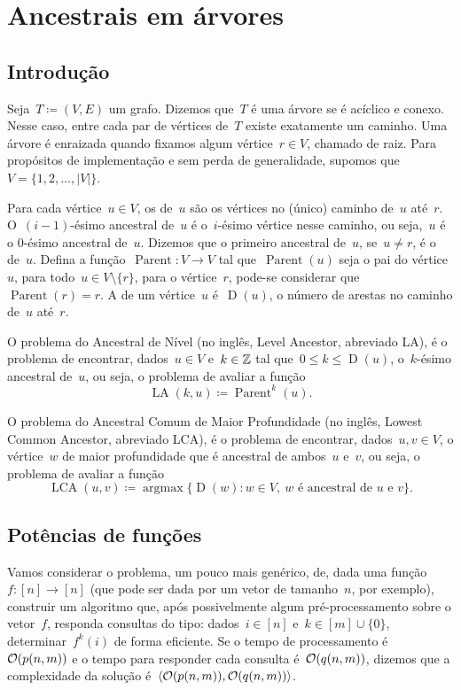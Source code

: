 \documentclass[main.tex]{subfiles}
\providecommand{\Par}{\operatorname{Parent}}
\newcommand{\LA}{\operatorname{LA}}
\newcommand{\Dep}{\operatorname{D}}
\newcommand{\LCA}{\operatorname{LCA}}
\newcommand{\argmax}{\operatorname{argmax}}
\begin{document}
\chapter{Ancestrais em árvores} \label{cap:ancestrais}

\section{Introdução}

Seja~$T \coloneqq (V, E)$ um grafo. Dizemos que~$T$ é uma árvore se é acíclico e conexo. Nesse caso, entre cada par de vértices de~$T$ existe exatamente um caminho. Uma árvore é enraizada quando fixamos algum vértice~${r \in V}$, chamado de raiz. Para propósitos de implementação e sem perda de generalidade, supomos que~$V = \{1, 2, \ldots, |V|\}$.


Para cada vértice~${u \in V}$, os  de~$u$ são os vértices no (único) caminho de~$u$ até~$r$. O~$(i-1)$-ésimo ancestral de~$u$ é o~$i$-ésimo vértice nesse caminho, ou seja,~$u$ é o $0$-ésimo ancestral de~$u$. Dizemos que o primeiro ancestral de~$u$, se~$u \neq r$, é o  de~$u$. Defina a função~${\Par: V \rightarrow V}$ tal que~$\Par(u)$ seja o pai do vértice~$u$, para todo~$u \in V \setminus \{r\}$, para o vértice~$r$, pode-se considerar que~$\Par(r) = r$. A  de um vértice~$u$ é~$\Dep(u)$, o número de arestas no caminho de~$u$ até~$r$.

O problema do Ancestral de Nível (no inglês, Level Ancestor, abreviado LA), é o problema de encontrar, dados~$u \in V$ e~$k \in \mathbb{Z}$ tal que~$0 \leq k \leq \Dep(u)$, o~$k$-ésimo ancestral de~$u$, ou seja, o problema de avaliar a função
$$\LA(k, u) \coloneqq \Par^k(u). $$

O problema do Ancestral Comum de Maior Profundidade (no inglês, Lowest Common Ancestor, abreviado LCA), é o problema de encontrar, dados~$u, v \in V$, o vértice~$w$ de maior profundidade que é ancestral de ambos~$u$ e~$v$, ou seja, o problema de avaliar a função
$$\LCA(u, v) \coloneqq \argmax\{\Dep(w) : w \in V,\ w \text{ é ancestral de $u$ e $v$}\}. $$

\section{Potências de funções} \label{sec:potfunc}

Vamos considerar o problema, um pouco mais genérico, de, dada uma função~$f : [n] \rightarrow [n]$ (que pode ser dada por um vetor de tamanho~$n$, por exemplo), construir um algoritmo que, após possivelmente algum pré-processamento sobre o vetor~$f$, responda consultas do tipo: dados~$i \in [n]$ e~$k \in [m] \cup \{0\}$, determinar~$f^k(i)$ de forma eficiente. Se o tempo de processamento é~$\mathcal{O}(p(n, m))$ e o tempo para responder cada consulta é~$\mathcal{O}(q(n, m))$, dizemos que a complexidade da solução é~$\langle\mathcal{O}(p(n, m)), \mathcal{O}(q(n, m))\rangle$.
\end{document}

